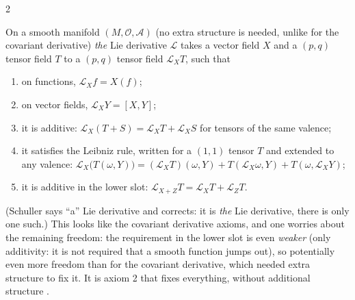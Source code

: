 \begin{paracol}{2}
\begin{definition}\label{def:c11-liederivative}
On a smooth manifold $(M,\mathcal O,\mathcal A)$ (no extra structure is needed, unlike for the covariant derivative) \emph{the} Lie derivative $\mathcal L$ takes a vector field $X$ and a $(p,q)$ tensor field $T$ to a $(p,q)$ tensor field $\mathcal L_XT$, such that
\begin{enumerate}
  \item on functions, $\mathcal L_Xf=X(f)$;
  \item on vector fields, $\mathcal L_XY=[X,Y]$;
  \item it is additive: $\mathcal L_X(T+S)=\mathcal L_XT+\mathcal L_XS$ for tensors of the same valence;
  \item it satisfies the Leibniz rule, written for a $(1,1)$ tensor $T$ and extended to any valence: $\mathcal L_X\bigl(T(\omega,Y)\bigr)=(\mathcal L_XT)(\omega,Y)+T(\mathcal L_X\omega,Y)+T(\omega,\mathcal L_XY)$;
  \item it is additive in the lower slot: $\mathcal L_{X+Z}T=\mathcal L_XT+\mathcal L_ZT$.
\end{enumerate}
\end{definition}
(Schuller says ``a'' Lie derivative and corrects: it is \emph{the} Lie derivative, there is only one such.) This looks like the covariant derivative axioms, and one worries about the remaining freedom: the requirement in the lower slot is even \emph{weaker} (only additivity: it is not required that a smooth function jumps out), so potentially even more freedom than for the covariant derivative, which needed extra structure to fix it. It is axiom 2 that fixes everything, without additional structure .


\end{paracol}
